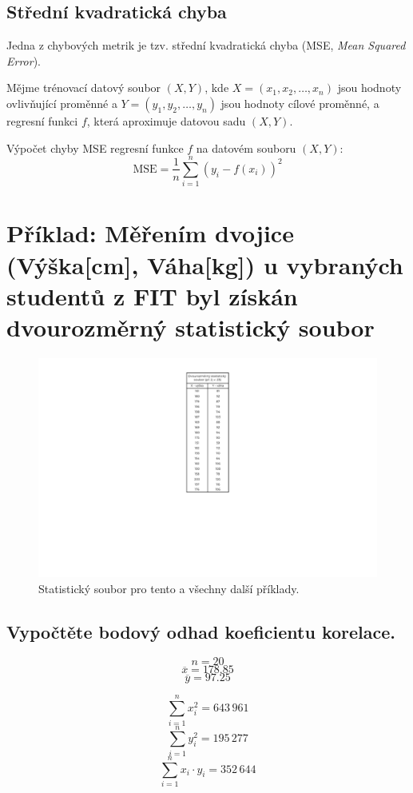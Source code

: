 \subsection{Střední kvadratická chyba}

\begin{compactitem}
    \item Jedna z chybových metrik je tzv. střední kvadratická chyba (MSE, \textit{Mean Squared Error}).

    \item Mějme trénovací datový soubor $(X, Y)$, kde $X = (x_1, x_2, \ldots, x_n)$ jsou hodnoty ovlivňující proměnné a $Y = (y_1, y_2, \ldots, y_n)$ jsou hodnoty cílové proměnné, a regresní funkci $f$, která aproximuje datovou sadu $(X, Y)$.

    \item Výpočet chyby MSE regresní funkce $f$ na datovém souboru $(X, Y)$:
    $$ \text{MSE} = \frac{1}{n} \sum_{i=1}^n (y_i - f(x_i))^2 $$
\end{compactitem}


\section{Příklad: Měřením dvojice (Výška[cm], Váha[kg]) u vybraných studentů z FIT byl získán dvourozměrný statistický soubor}

\begin{figure}[H]
    \centering
    \includegraphics[width=.3\linewidth]{2-1-crop.pdf}
    \caption{Statistický soubor pro tento a všechny další příklady.}
\end{figure}

\subsection{Vypočtěte bodový odhad koeficientu korelace.}

\begin{minipage}{0.49\textwidth}
    $${\displaystyle n = 20}$$
    $${\displaystyle \overline{x} = 178.85}$$
    $${\displaystyle \overline{y} = 97.25}$$
\end{minipage}
%
\begin{minipage}{0.49\textwidth}
    $${\displaystyle \sum_{i=1}^n x_i^2 = 643 \, 961}$$
    $${\displaystyle \sum_{i=1}^n y_i^2 = 195 \, 277}$$
    $${\displaystyle \sum_{i=1}^n x_i \cdot y_i = 352 \, 644}$$
\end{minipage}
\bigskip

